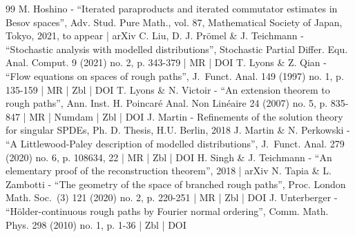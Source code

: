 \documentclass[10pt]{amsart}
\theoremstyle{plain}
\theoremstyle{definition}
\begin{document}
\begin{thebibliography}{99}
M. Hoshino - “Iterated paraproducts and iterated commutator estimates in Besov spaces”, Adv. Stud. Pure Math., vol. 87, Mathematical Society of Japan, Tokyo, 2021, to appear | arXiv
C. Liu, D. J. Prömel \& J. Teichmann - “Stochastic analysis with modelled distributions”, Stochastic Partial Differ. Equ. Anal. Comput. 9 (2021) no. 2, p. 343-379 | MR | DOI
T. Lyons \& Z. Qian - “Flow equations on spaces of rough paths”, J. Funct. Anal. 149 (1997) no. 1, p. 135-159 | MR | Zbl | DOI
T. Lyons \& N. Victoir - “An extension theorem to rough paths”, Ann. Inst. H. Poincaré Anal. Non Linéaire 24 (2007) no. 5, p. 835-847 | MR | Numdam | Zbl | DOI
J. Martin - Refinements of the solution theory for singular SPDEs, Ph. D. Thesis, H.U. Berlin, 2018
J. Martin \& N. Perkowski - “A Littlewood-Paley description of modelled distributions”, J. Funct. Anal. 279 (2020) no. 6, p. 108634, 22 | MR | Zbl | DOI
H. Singh \& J. Teichmann - “An elementary proof of the reconstruction theorem”, 2018 | arXiv
N. Tapia \& L. Zambotti - “The geometry of the space of branched rough paths”, Proc. London Math. Soc. (3) 121 (2020) no. 2, p. 220-251 | MR | Zbl | DOI
J. Unterberger - “Hölder-continuous rough paths by Fourier normal ordering”, Comm. Math. Phys. 298 (2010) no. 1, p. 1-36 | Zbl | DOI
\end{thebibliography}
\end{document}
